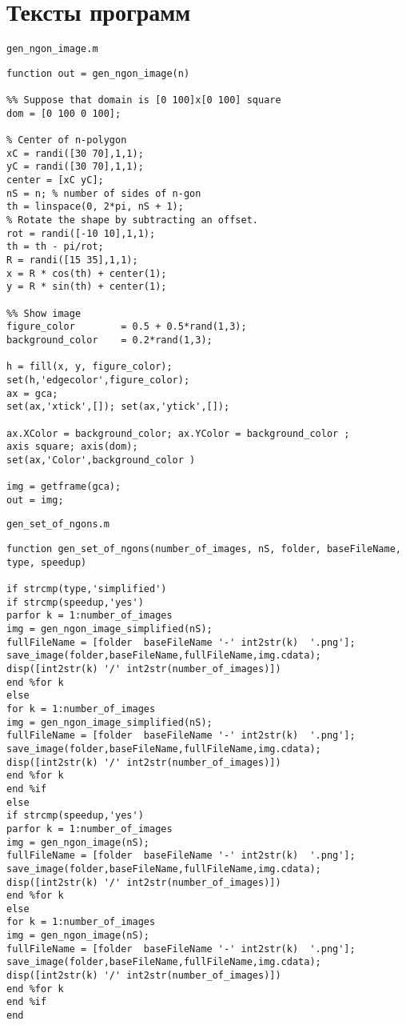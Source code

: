 \documentclass[12pt,a4paper]{article}
\begin{document}
\newpage
\appendix 
{}

\section*{Тексты программ}

\verb|gen_ngon_image.m|
\begin{lstlisting}
function out = gen_ngon_image(n)

%% Suppose that domain is [0 100]x[0 100] square
dom = [0 100 0 100];

% Center of n-polygon
xC = randi([30 70],1,1);
yC = randi([30 70],1,1);
center = [xC yC];
nS = n; % number of sides of n-gon
th = linspace(0, 2*pi, nS + 1);
% Rotate the shape by subtracting an offset.
rot = randi([-10 10],1,1);
th = th - pi/rot;
R = randi([15 35],1,1);
x = R * cos(th) + center(1);
y = R * sin(th) + center(1);

%% Show image
figure_color        = 0.5 + 0.5*rand(1,3);
background_color    = 0.2*rand(1,3);

h = fill(x, y, figure_color);
set(h,'edgecolor',figure_color);
ax = gca;
set(ax,'xtick',[]); set(ax,'ytick',[]);

ax.XColor = background_color; ax.YColor = background_color ;
axis square; axis(dom);
set(ax,'Color',background_color )

img = getframe(gca);
out = img;
\end{lstlisting}

\noindent
\verb|gen_set_of_ngons.m|
\begin{lstlisting}
function gen_set_of_ngons(number_of_images, nS, folder, baseFileName, type, speedup)

if strcmp(type,'simplified')
if strcmp(speedup,'yes')
parfor k = 1:number_of_images
img = gen_ngon_image_simplified(nS);
fullFileName = [folder  baseFileName '-' int2str(k)  '.png'];
save_image(folder,baseFileName,fullFileName,img.cdata);
disp([int2str(k) '/' int2str(number_of_images)])
end %for k
else
for k = 1:number_of_images
img = gen_ngon_image_simplified(nS);
fullFileName = [folder  baseFileName '-' int2str(k)  '.png'];
save_image(folder,baseFileName,fullFileName,img.cdata);
disp([int2str(k) '/' int2str(number_of_images)])
end %for k
end %if
else
if strcmp(speedup,'yes')
parfor k = 1:number_of_images
img = gen_ngon_image(nS);
fullFileName = [folder  baseFileName '-' int2str(k)  '.png'];
save_image(folder,baseFileName,fullFileName,img.cdata);
disp([int2str(k) '/' int2str(number_of_images)])
end %for k
else
for k = 1:number_of_images
img = gen_ngon_image(nS);
fullFileName = [folder  baseFileName '-' int2str(k)  '.png'];
save_image(folder,baseFileName,fullFileName,img.cdata);
disp([int2str(k) '/' int2str(number_of_images)])
end %for k
end %if    
end 
\end{lstlisting}
\end{document}
